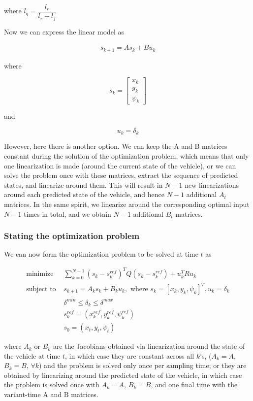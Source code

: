 where $l_q = \dfrac{l_r}{l_r + l_f}$

Now we can express the linear model as

\begin{align}
  s_{k+1} = A s_k + B u_k
\end{align}

where

\begin{equation}
  s_k=
  \begin{bmatrix}
    x_{k} \\
    y_{k} \\
    \psi_{k}
  \end{bmatrix}
\end{equation}

and

\begin{equation}
  u_k= \delta_{k}
\end{equation}


However, here there is another option. We can keep the A and B matrices
constant during the solution of the optimization problem, which means that
only one linearization is made (around the current state of the vehicle),
or we can solve the problem once with these matrices, extract the sequence of
predicted states, and linearize around them. This will result in $N-1$ new
linearizations around each predicted state of the vehicle, and hence $N-1$
additional $A_t$ matrices. In the same spirit, we linearize around the
corresponding optimal input $N-1$ times in total, and we obtain $N-1$
additional $B_t$ matrices.


\subsubsection{Stating the optimization problem}

We can now form the optimization problem to be solved at time $t$ as

\begin{align}
  \text{minimize }    & \sum\limits_{k=0}^{N-1} (s_k - s_k^{ref})^T Q (s_k - s_k^{ref}) + u_k^T R u_k \\
  \text{subject to }  & s_{k+1} = A_k s_k + B_k u_k, \text{ where } s_k = [x_k, y_k, \psi_k]^T, u_k = \delta_k \\
                      & \delta^{min} \leq \delta_k \leq \delta^{max} \\
                      & s_k^{ref} = (x_k^{ref}, y_k^{ref}, \psi_k^{ref}) \\
                      & s_0 = (x_t, y_t, \psi_t)
\end{align}

where $A_k$ or $B_k$ are the Jacobians obtained via linearization around
the state of the vehicle at time $t$, in which case they are constant across all
$k$'s, ($A_k = A$, $B_k = B$, $\forall k$) and the problem is solved only
once per sampling time; or they are obtained by linearizing around the
predicted state of the vehicle, in which case the problem is solved once
with $A_k = A$, $B_k = B$, and one final time with the variant-time A and B
matrices.
